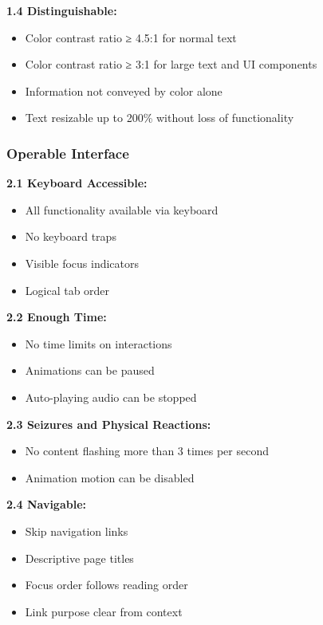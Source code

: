 \documentclass[12pt, a4paper]{article}
\begin{document}
\textbf{1.4 Distinguishable:}
\begin{itemize}[leftmargin=*]
    \item Color contrast ratio ≥ 4.5:1 for normal text
    \item Color contrast ratio ≥ 3:1 for large text and UI components
    \item Information not conveyed by color alone
    \item Text resizable up to 200\% without loss of functionality
\end{itemize}

\subsubsection{Operable Interface}

\textbf{2.1 Keyboard Accessible:}
\begin{itemize}[leftmargin=*]
    \item All functionality available via keyboard
    \item No keyboard traps
    \item Visible focus indicators
    \item Logical tab order
\end{itemize}

\textbf{2.2 Enough Time:}
\begin{itemize}[leftmargin=*]
    \item No time limits on interactions
    \item Animations can be paused
    \item Auto-playing audio can be stopped
\end{itemize}

\textbf{2.3 Seizures and Physical Reactions:}
\begin{itemize}[leftmargin=*]
    \item No content flashing more than 3 times per second
    \item Animation motion can be disabled
\end{itemize}

\textbf{2.4 Navigable:}
\begin{itemize}[leftmargin=*]
    \item Skip navigation links
    \item Descriptive page titles
    \item Focus order follows reading order
    \item Link purpose clear from context
\end{itemize}
\end{document}
